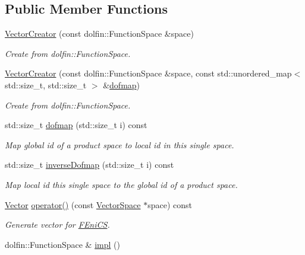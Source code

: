 \subsection*{Public Member Functions}
\begin{DoxyCompactItemize}
\item 
\hyperlink{classSpacy_1_1FEniCS_1_1VectorCreator_aadd31cbf47db5a102001cd97f0a844bc_aadd31cbf47db5a102001cd97f0a844bc}{Vector\+Creator} (const dolfin\+::\+Function\+Space \&space)
\begin{DoxyCompactList}\small\item\em Create from dolfin\+::\+Function\+Space. \end{DoxyCompactList}\item 
\hyperlink{classSpacy_1_1FEniCS_1_1VectorCreator_a4140fedb928d0fa1bdf5e449b2dc964a_a4140fedb928d0fa1bdf5e449b2dc964a}{Vector\+Creator} (const dolfin\+::\+Function\+Space \&space, const std\+::unordered\+\_\+map$<$ std\+::size\+\_\+t, std\+::size\+\_\+t $>$ \&\hyperlink{classSpacy_1_1FEniCS_1_1VectorCreator_ad41a34e44494e8d166f9890a8877f994_ad41a34e44494e8d166f9890a8877f994}{dofmap})
\begin{DoxyCompactList}\small\item\em Create from dolfin\+::\+Function\+Space. \end{DoxyCompactList}\item 
std\+::size\+\_\+t \hyperlink{classSpacy_1_1FEniCS_1_1VectorCreator_ad41a34e44494e8d166f9890a8877f994_ad41a34e44494e8d166f9890a8877f994}{dofmap} (std\+::size\+\_\+t i) const 
\begin{DoxyCompactList}\small\item\em Map global id of a product space to local id in this single space. \end{DoxyCompactList}\item 
std\+::size\+\_\+t \hyperlink{classSpacy_1_1FEniCS_1_1VectorCreator_a8e369dcbb722462ee0bca008eae6b2f3_a8e369dcbb722462ee0bca008eae6b2f3}{inverse\+Dofmap} (std\+::size\+\_\+t i) const 
\begin{DoxyCompactList}\small\item\em Map local id this single space to the global id of a product space. \end{DoxyCompactList}\item 
\hyperlink{classSpacy_1_1FEniCS_1_1Vector}{Vector} \hyperlink{classSpacy_1_1FEniCS_1_1VectorCreator_a5a2881bf1a3fcbda91355b4e3d0ac284_a5a2881bf1a3fcbda91355b4e3d0ac284}{operator()} (const \hyperlink{classSpacy_1_1VectorSpace}{Vector\+Space} $\ast$space) const 
\begin{DoxyCompactList}\small\item\em Generate vector for \hyperlink{namespaceSpacy_1_1FEniCS}{F\+Eni\+C\+S}. \end{DoxyCompactList}\item 
\hypertarget{classSpacy_1_1Mixin_1_1Impl_a5e61399bae41338a87e701b24b13f52a}{}dolfin\+::\+Function\+Space \& \hyperlink{classSpacy_1_1Mixin_1_1Impl_a5e61399bae41338a87e701b24b13f52a}{impl} ()\label{classSpacy_1_1Mixin_1_1Impl_a5e61399bae41338a87e701b24b13f52a}


\end{DoxyCompactItemize}

